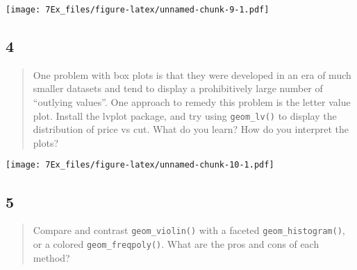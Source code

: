 \documentclass[]{article}
\newenvironment{Shaded}{\begin{snugshade}}{\end{snugshade}}
\newcommand{\DataTypeTok}[1]{\textcolor[rgb]{0.13,0.29,0.53}{#1}}
\newcommand{\KeywordTok}[1]{\textcolor[rgb]{0.13,0.29,0.53}{\textbf{#1}}}
\newcommand{\NormalTok}[1]{#1}
\newcommand{\OperatorTok}[1]{\textcolor[rgb]{0.81,0.36,0.00}{\textbf{#1}}}
\newcommand{\StringTok}[1]{\textcolor[rgb]{0.31,0.60,0.02}{#1}}
\begin{document}
\texttt{[image: 7Ex\_files/figure-latex/unnamed-chunk-9-1.pdf]}

\hypertarget{section-12}{%
\subsection{4}\label{section-12}}

\begin{quote}
One problem with box plots is that they were developed in an era of much
smaller datasets and tend to display a prohibitively large number of
``outlying values''. One approach to remedy this problem is the letter
value plot. Install the lvplot package, and try using
\texttt{geom\_lv()} to display the distribution of price vs cut. What do
you learn? How do you interpret the plots?
\end{quote}

\begin{Shaded}
\end{Shaded}

\texttt{[image: 7Ex\_files/figure-latex/unnamed-chunk-10-1.pdf]}

\hypertarget{section-13}{%
\subsection{5}\label{section-13}}

\begin{quote}
Compare and contrast \texttt{geom\_violin()} with a faceted
\texttt{geom\_histogram()}, or a colored \texttt{geom\_freqpoly()}. What
are the pros and cons of each method?
\end{quote}

\begin{Shaded}
\end{Shaded}
\end{document}
